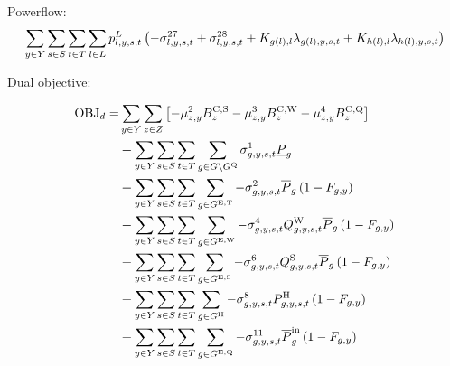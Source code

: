 \documentclass{article}
\begin{document}
Powerflow:
\begin{equation}
	\sumIntervals \sum\limits_{\iLink \in \sLinks} \vPowerFlow \left(-\dMinPowerFlow + \dMaxPowerFlow + \cIncidenceMatrix[g(\iLink), \iLink] \dPowerBalance[g(\iLink),\iYear,\iScenario,\iInterval] + \cIncidenceMatrix[h(\iLink), \iLink] \dPowerBalance[h(\iLink),\iYear,\iScenario,\iInterval]\right)
\end{equation}

Dual objective:

\begin{align}
\textrm{OBJ}_{d} =  & \sum\limits_{\iYear \in \sYears} \sum\limits_{\iZone \in \sZones} \left[- \dSolarBuildLimit \cBuildLimitSolar - \dWindBuildLimit \cBuildLimitWind 
- \dStorageBuildLimit \cBuildLimitStorage
\right]\\
& + \sum\limits_{\iYear \in \sYears}\sum\limits_{\iScenario \in \sScenarios}\sum\limits_{\iInterval \in \sIntervals} \sum\limits_{\iGenerator \in \sGenerators \setminus \sStorage} \dMinPowerOutput \cPowerOutputMin\\
& + \sum\limits_{\iYear \in \sYears}\sum\limits_{\iScenario \in \sScenarios}\sum\limits_{\iInterval \in \sIntervals} \sum\limits_{\iGenerator \in \sGeneratorsExistingThermal} - \dMaxPowerOutputExistingThermal \cPowerOutputMax[\iGenerator] \left(1 - \cRetirementIndicator\right)\\
& + \sum\limits_{\iYear \in \sYears}\sum\limits_{\iScenario \in \sScenarios}\sum\limits_{\iInterval \in \sIntervals} \sum\limits_{\iGenerator \in \sGeneratorsExistingWind} - \dMaxPowerOutputWindExisting \cCapacityFactorWind \cPowerOutputMax[\iGenerator] \left(1 - \cRetirementIndicator\right)\\
& + \sum\limits_{\iYear \in \sYears}\sum\limits_{\iScenario \in \sScenarios}\sum\limits_{\iInterval \in \sIntervals} \sum\limits_{\iGenerator \in \sGeneratorsExistingSolar} - \dMaxPowerOutputSolarExisting \cCapacityFactorSolar \cPowerOutputMax[\iGenerator] \left(1 - \cRetirementIndicator\right)\\
& + \sum\limits_{\iYear \in \sYears}\sum\limits_{\iScenario \in \sScenarios}\sum\limits_{\iInterval \in \sIntervals} \sum\limits_{\iGenerator \in \sGeneratorsHydro} - \dMaxPowerOutputHydro \cPowerOutputHydro \left(1 - \cRetirementIndicator\right)\\
& + \sum\limits_{\iYear \in \sYears}\sum\limits_{\iScenario \in \sScenarios}\sum\limits_{\iInterval \in \sIntervals} \sum\limits_{\iGenerator \in \sStorageExisting} - \dMaxChargingRateExisting \cPowerChargingMax \left(1 - \cRetirementIndicator\right)\\

\end{align}
\end{document}
